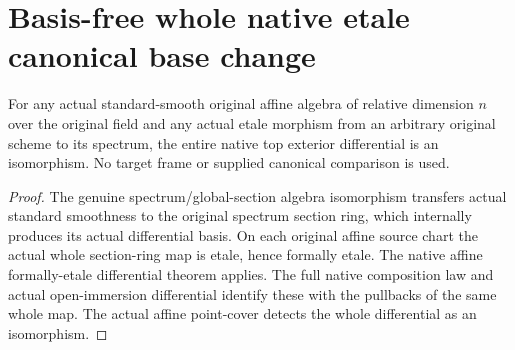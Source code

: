 \section{Basis-free whole native etale canonical base change}

\begin{lemma}
\label{lem:kn-canonical-standard-smooth-etale}
\leanok
For any actual standard-smooth original affine algebra of relative
dimension $n$ over the original field and any actual etale morphism from
an arbitrary original scheme to its spectrum, the entire native top
exterior differential is an isomorphism. No target frame or supplied
canonical comparison is used.
\end{lemma}
\begin{proof}
The genuine spectrum/global-section algebra isomorphism transfers actual
standard smoothness to the original spectrum section ring, which internally
produces its actual differential basis. On each original affine source
chart the actual whole section-ring map is etale, hence formally etale.
The native affine formally-etale differential theorem applies. The full
native composition law and actual open-immersion differential identify
these with the pullbacks of the same whole map. The actual affine point-cover
detects the whole differential as an isomorphism.
\end{proof}

